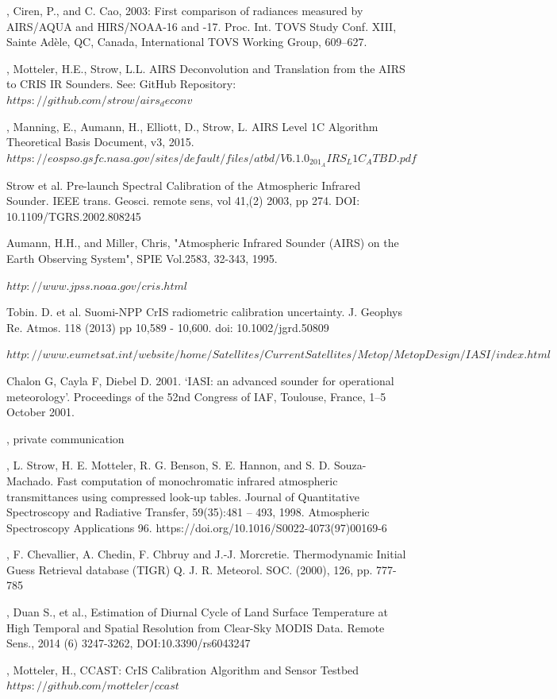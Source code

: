 \documentclass[11pt]{article}
\begin{document}
\begin{thebibliography}{9}
  \emph{},
  Ciren, P., and C. Cao, 2003: First comparison of radiances measured by AIRS/AQUA and HIRS/NOAA-16 and -17. 
  Proc. Int. TOVS Study Conf. XIII, Sainte Adèle, QC, Canada, International TOVS Working Group, 609–627.

  \emph{},
  Motteler, H.E., Strow, L.L.
  AIRS Deconvolution and Translation from the AIRS to CRIS IR Sounders. See:
  GitHub Repository:
  $ https://github.com/strow/airs_deconv $

  \emph{},
  Manning, E., Aumann, H., Elliott, D., Strow, L.
  AIRS Level 1C Algorithm Theoretical Basis Document, v3, 2015.
  $ https://eospso.gsfc.nasa.gov/sites/default/files/atbd/V6.1.0_201_AIRS_L1C_ATBD.pdf $
  
  Strow et al. 
  Pre-launch Spectral Calibration of the Atmospheric Infrared Sounder.
  IEEE trans. Geosci. remote sens,
  vol 41,(2) 2003, pp 274.
  DOI: 10.1109/TGRS.2002.808245

  Aumann, H.H., and Miller, Chris, 
  "Atmospheric Infrared Sounder (AIRS) on the Earth Observing System", 
  SPIE Vol.2583, 32-343, 1995.

 $ http://www.jpss.noaa.gov/cris.html $

  Tobin. D. et al.
  Suomi-NPP CrIS radiometric calibration uncertainty.
  J. Geophys Re. Atmos. 118 (2013) pp 10,589 - 10,600.
  doi: 10.1002/jgrd.50809

  $ http://www.eumetsat.int/website/home/Satellites/CurrentSatellites/Metop/MetopDesign/IASI/index.html $

  Chalon G, Cayla F, Diebel D. 2001. 
  ‘IASI: an advanced sounder for operational meteorology’. 
  Proceedings of the 52nd Congress of IAF, Toulouse, France, 1–5 October 2001.

  \emph{},
  private communication

  \emph{},
  L. Strow, H. E. Motteler, R. G. Benson, S. E. Hannon, and S. D. Souza-Machado. 
  Fast computation of monochromatic infrared atmospheric transmittances using compressed look-up tables. 
  Journal of Quantitative Spectroscopy and Radiative Transfer, 59(35):481 – 493, 1998. 
  Atmospheric Spectroscopy Applications 96.
  https://doi.org/10.1016/S0022-4073(97)00169-6

  \emph{},
  F. Chevallier, A. Chedin, F. Chbruy and J.-J. Morcretie.
  Thermodynamic Initial Guess Retrieval database  (TIGR) 
  Q. J. R. Meteorol. SOC. (2000), 126, pp.  777-785

  \emph{},
  Duan S., et al.,
  Estimation of Diurnal Cycle of Land Surface Temperature at High Temporal and Spatial Resolution from Clear-Sky MODIS Data.
  Remote Sens., 2014 (6) 3247-3262,
  DOI:10.3390/rs6043247

  \emph{},
  Motteler, H.,
  CCAST: CrIS Calibration Algorithm and Sensor Testbed 
  $ https://github.com/motteler/ccast $
  
\end{thebibliography}
\end{document}
